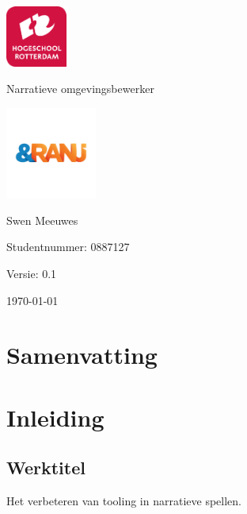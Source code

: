 \documentclass{report}
\newcommand{\versionnumber}{0.1}
\newcommand{\name}{Swen Meeuwes}
\newcommand{\studentnumber}{0887127}
\renewcommand{\title}{Narratieve omgevingsbewerker}
\newcommand{\subtitle}{}
\begin{document}
\begin{titlepage}
        \centering
        \includegraphics[width=2cm]{Images/University}\par
        \vspace{4\baselineskip}
        {\Huge\title\par}
        {\Large\subtitle\par}
        \par
        \includegraphics[width=3cm]{Images/Organisation}
        \vspace{4\baselineskip}
        \par
        {\Large\name\par}
        {Studentnummer: \studentnumber\par}
        \vfill
        {\hfill Versie: \versionnumber\par}
        {\hfill \today}
\end{titlepage}

\chapter*{Samenvatting}

\newpage

\tableofcontents

\chapter{Inleiding}
\section{Werktitel}
Het verbeteren van tooling in narratieve spellen. %
\end{document}

